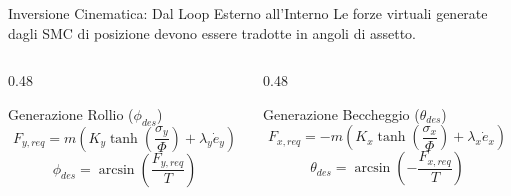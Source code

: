 \documentclass[aspectratio=169]{beamer} %
\begin{document}
\begin{frame}{Inversione Cinematica: Dal Loop Esterno all'Interno}
    Le forze virtuali generate dagli SMC di posizione devono essere tradotte in angoli di assetto.
    
    \vspace{0.4cm}
    \begin{columns}[c]
        \begin{column}{0.48\textwidth}
            \begin{block}{Generazione Rollio ($\phi_{des}$)}
                \begin{equation}
                    F_{y,req} = m \left( K_y \tanh\left(\frac{\sigma_y}{\Phi}\right) + \lambda_y \dot{e}_y \right)
                \end{equation}
                \begin{equation}
                    \phi_{des} = \arcsin\left( \frac{F_{y,req}}{T} \right)
                \end{equation}
            \end{block}
        \end{column}
        
        \hfill 
        
        \begin{column}{0.48\textwidth}
            \begin{block}{Generazione Beccheggio ($\theta_{des}$)}
                \begin{equation}
                    F_{x,req} = -m \left(K_x \tanh\left(\frac{\sigma_x}{\Phi}\right) + \lambda_x \dot{e}_x \right)
                \end{equation}
                \begin{equation}
                    \theta_{des} = \arcsin\left( - \frac{F_{x,req}}{T} \right)
                \end{equation}
            \end{block}
        \end{column}
    \end{columns}
    

\end{frame}

\end{document}
